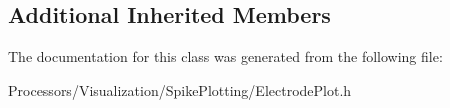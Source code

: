 \subsection*{Additional Inherited Members}


The documentation for this class was generated from the following file\-:\begin{DoxyCompactItemize}
\item 
Processors/\-Visualization/\-Spike\-Plotting/Electrode\-Plot.\-h\end{DoxyCompactItemize}
